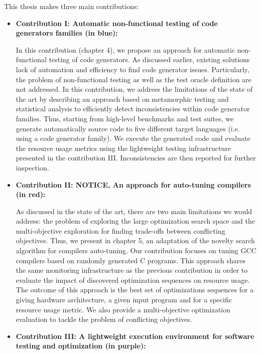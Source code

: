 This thesis makes three main contributions:
\begin{itemize}
	\item \textbf{Contribution I: Automatic non-functional testing of code generators families (in blue): }
	
	In this contribution (chapter 4), we propose an approach for automatic non-functional  testing of code generators. As discussed earlier, existing solutions lack of automation and efficiency to find code generator issues. Particularly, the problem of non-functional testing as well as the test oracle definition are not addressed. In this contribution, we address the limitations of the state of the art by describing an approach based on metamorphic testing and statistical analysis to efficiently detect inconsistencies within code generator families.
	Thus, starting from high-level benchmarks and test suites, we generate automatically source code to five different target languages (i.e. using a code generator family). We execute the generated code and evaluate the resource usage metrics using the lightweight testing infrastructure presented in the contribution III. Inconsistencies are then reported for further inspection.  
	
	\item \textbf{Contribution II: NOTICE, An approach for auto-tuning compilers (in red):}
	
	As discussed in the state of the art, there are two main limitations we would address: the problem of exploring the large optimization search space and the multi-objective exploration for finding trade-offs between conflicting objectives. 
	Thus, we present in chapter 5, an adaptation of the novelty search algorithm for compilers auto-tuning. Our contribution focuses on tuning GCC compilers based on randomly generated C programs.
	This approach shares the same monitoring infrastructure as the previous contribution in order to evaluate the impact of discovered optimization sequences on resource usage. The outcome of this approach is the best set of optimizations sequences for a giving hardware architecture, a given input program and for a specific resource usage metric. We also provide a multi-objective optimization evaluation to tackle the problem of conflicting objectives.
	
	\item \textbf{Contribution III: A lightweight execution environment for software testing and optimization (in purple):}
	

\end{itemize}
